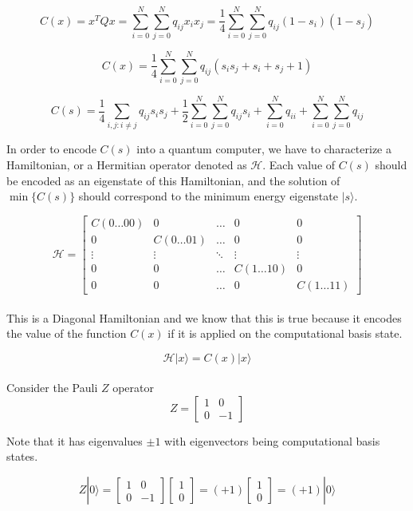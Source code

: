\documentclass[12pt,a4paper]{report}
\begin{document}
\[
C(x) = x^T Q x = \sum_{i=0}^{N} \sum_{j=0}^{N} q_{ij} x_i x_j = \frac{1}{4} \sum_{i=0}^{N} \sum_{j=0}^{N}  q_{ij} (1-s_i)(1-s_j)
\]

\[
C(x) = \frac{1}{4} \sum_{i=0}^{N} \sum_{j=0}^{N} q_{ij} (s_i s_j + s_i + s_j + 1)
\]

\[
C(s) = \frac{1}{4} \sum_{{i,j : i \neq j}} q_{ij} s_i s_j + \frac{1}{2} \sum_{i=0}^{N} \sum_{j=0}^{N} q_{ij} s_i + \sum_{i=0}^{N} q_{ii} + \sum_{i=0}^{N} \sum_{j=0}^{N} q_{ij}
\]

\noindent
In order to encode \(C(s)\) into a quantum computer, we have to characterize a Hamiltonian, or a Hermitian operator denoted as \( \mathcal{H} \). Each value of \(C(s)\) should be encoded as an eigenstate of this Hamiltonian, and the solution of \(\min\{C(s)\}\) should correspond to the minimum energy eigenstate \(|s\rangle\).

\[
\mathcal{H} = 
\begin{bmatrix}
C(0\ldots00) & 0 & \ldots & 0 & 0 \\
0 & C(0\ldots01) & \ldots & 0 & 0 \\
\vdots & \vdots & \ddots & \vdots & \vdots \\
0 & 0 & \ldots & C(1\ldots10) & 0 \\
0 & 0 & \ldots & 0 & C(1\ldots11)
\end{bmatrix}
\]
\\

\noindent
This is a Diagonal Hamiltonian and we know that this is true because it encodes the value of the function \(C(x)\) if it is applied on the computational basis state.

\[
\mathcal{H} |x\rangle = C(x) |x\rangle
\]
\\

\noindent
Consider the Pauli \(Z\) operator
\[
Z = 
\begin{bmatrix}
1 & 0 \\
0 & -1 
\end{bmatrix}
\]

\noindent
Note that it has eigenvalues \(\pm 1\) with eigenvectors being computational basis states.

\[
Z|0\rangle = 
\begin{bmatrix}
1 & 0 \\
0 & -1 
\end{bmatrix}
\begin{bmatrix}
1 \\
0 
\end{bmatrix} 
= (+1) 
\begin{bmatrix}
1 \\
0 
\end{bmatrix} 
= (+1) |0\rangle
\]
\end{document}

